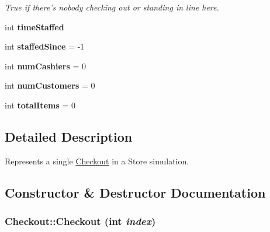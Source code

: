 \begin{CompactItemize}
\begin{CompactList}\small\item\em True if there's nobody checking out or standing in line here. \item\end{CompactList}\item 
\hypertarget{class_checkout_3c125bd8b5e7cbe92a492b49068b9f46}{
int \textbf{timeStaffed}}
\label{class_checkout_3c125bd8b5e7cbe92a492b49068b9f46}

\item 
\hypertarget{class_checkout_ffa8c25957072d446633a3fa2f57a296}{
int \textbf{staffedSince} = -1}
\label{class_checkout_ffa8c25957072d446633a3fa2f57a296}

\item 
\hypertarget{class_checkout_4bebc3da587be865fa8f9ad2891070c4}{
int \textbf{numCashiers} = 0}
\label{class_checkout_4bebc3da587be865fa8f9ad2891070c4}

\item 
\hypertarget{class_checkout_ff94cdb4666415041f5e4a14fa1a2f63}{
int \textbf{numCustomers} = 0}
\label{class_checkout_ff94cdb4666415041f5e4a14fa1a2f63}

\item 
\hypertarget{class_checkout_dc677e1570c3b3a86f9a08055fd5aa91}{
int \textbf{totalItems} = 0}
\label{class_checkout_dc677e1570c3b3a86f9a08055fd5aa91}

\end{CompactItemize}


\subsection{Detailed Description}
Represents a single \hyperlink{class_checkout}{Checkout} in a Store simulation. 

\subsection{Constructor \& Destructor Documentation}
\hypertarget{class_checkout_13d3d44f84ba45013d54b5a57c0b1d94}{
\subsubsection[{Checkout}]{\setlength{\rightskip}{0pt plus 5cm}Checkout::Checkout (int {\em index})}}
\label{class_checkout_13d3d44f84ba45013d54b5a57c0b1d94}


